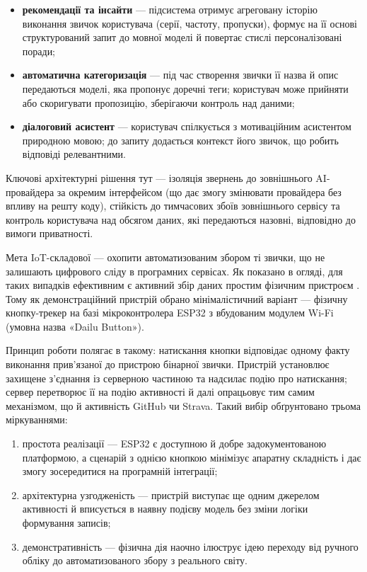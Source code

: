\begin{itemize}[noitemsep, topsep=2pt, leftmargin=*, label=--]
    \item \textbf{рекомендації та інсайти} — підсистема отримує агреговану історію виконання звичок користувача (серії, частоту, пропуски), формує на її основі структурований запит до мовної моделі й повертає стислі персоналізовані поради;
    \item \textbf{автоматична категоризація} — під час створення звички її назва й опис передаються моделі, яка пропонує доречні теги; користувач може прийняти або скоригувати пропозицію, зберігаючи контроль над даними;
    \item \textbf{діалоговий асистент} — користувач спілкується з мотиваційним асистентом природною мовою; до запиту додається контекст його звичок, що робить відповіді релевантними.
\end{itemize}

Ключові архітектурні рішення тут — ізоляція звернень до зовнішнього AI-провайдера за окремим
інтерфейсом (що дає змогу змінювати провайдера без впливу на решту коду), стійкість до
тимчасових збоїв зовнішнього сервісу та контроль користувача над обсягом даних, які передаються
назовні, відповідно до вимоги приватності.


Мета IoT-складової — охопити автоматизованим збором ті звички, що не залишають цифрового сліду
в програмних сервісах.
Як показано в огляді, для таких випадків ефективним є активний збір даних простим фізичним
пристроєм .
Тому як демонстраційний пристрій обрано мінімалістичний варіант — фізичну кнопку-трекер на базі
мікроконтролера ESP32 з вбудованим модулем Wi-Fi (умовна назва «Dailu Button»).

Принцип роботи полягає в такому: натискання кнопки відповідає одному факту виконання прив'язаної
до пристрою бінарної звички.
Пристрій установлює захищене з'єднання із серверною частиною та надсилає подію про натискання;
сервер перетворює її на подію активності й далі опрацьовує тим самим механізмом, що й активність
GitHub чи Strava.
Такий вибір обґрунтовано трьома міркуваннями:

\begin{enumerate}[noitemsep, topsep=2pt, leftmargin=*, label=\arabic*)]
    \item простота реалізації — ESP32 є доступною й добре задокументованою платформою, а сценарій з однією кнопкою мінімізує апаратну складність і дає змогу зосередитися на програмній інтеграції;
    \item архітектурна узгодженість — пристрій виступає ще одним джерелом активності й вписується в наявну подієву модель без зміни логіки формування записів;
    \item демонстративність — фізична дія наочно ілюструє ідею переходу від ручного обліку до автоматизованого збору з реального світу.
\end{enumerate}

